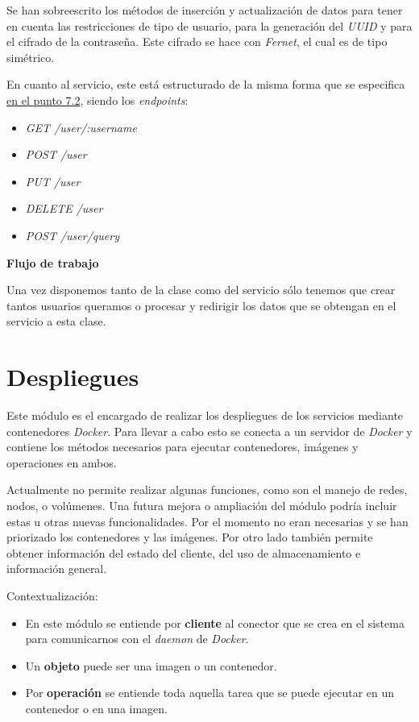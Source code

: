 \bigskip
Se han sobreescrito los métodos de inserción y actualización de datos para tener en cuenta las restricciones de tipo de usuario, para la generación del \textit{UUID} y para el cifrado de la contraseña. Este cifrado se hace con \textit{Fernet}, el cual es de tipo simétrico.

En cuanto al servicio, este está estructurado de la misma forma que se especifica \hyperref[sec:servicios]{en el punto 7.2}, siendo los \textit{endpoints}:
\begin{itemize}
	\item \textit{GET /user/:username}
	\item \textit{POST /user}
	\item \textit{PUT /user}
	\item \textit{DELETE /user}
	\item \textit{POST /user/query}
\end{itemize}

\bigskip
\textbf{Flujo de trabajo}

Una vez disponemos tanto de la clase como del servicio sólo tenemos que crear tantos usuarios queramos o procesar y redirigir los datos que se obtengan en el servicio a esta clase.




\section{Despliegues}

Este módulo es el encargado de realizar los despliegues de los servicios mediante contenedores \textit{Docker}. Para llevar a cabo esto se conecta a un servidor de \textit{Docker} y contiene los métodos necesarios para ejecutar contenedores, imágenes y operaciones en ambos.

Actualmente no permite realizar algunas funciones, como son el manejo de redes, nodos, o volúmenes. Una futura mejora o ampliación del módulo podría incluir estas u otras nuevas funcionalidades. Por el momento no eran necesarias y se han priorizado los contenedores y las imágenes. Por otro lado también permite obtener información del estado del cliente, del uso de almacenamiento e información general.

\bigskip
Contextualización:
\begin{itemize}
	\item En este módulo se entiende por \textbf{cliente} al conector que se crea en el sistema para comunicarnos con el \textit{daemon} de \textit{Docker}.
	\item Un \textbf{objeto} puede ser una imagen o un contenedor.
	\item Por \textbf{operación} se entiende toda aquella tarea que se puede ejecutar en un contenedor o en una imagen.
\end{itemize}

